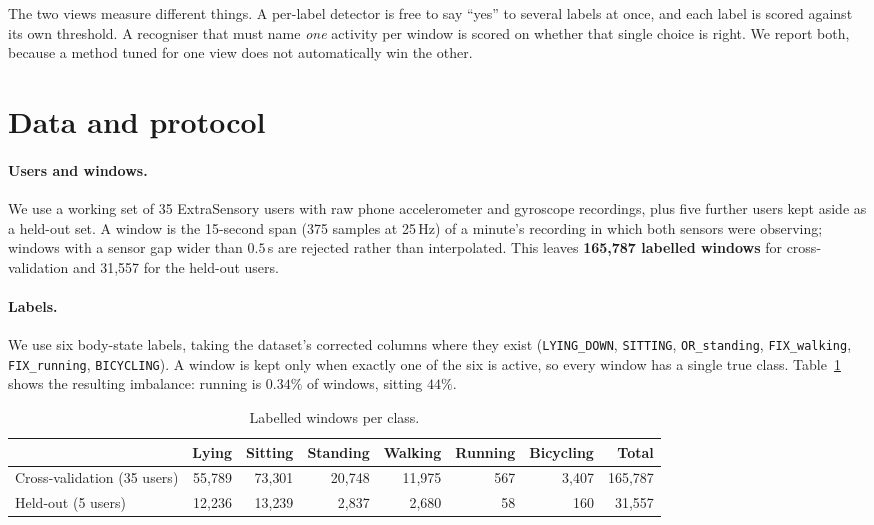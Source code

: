 \documentclass[11pt,a4paper]{article}
\newcommand{\code}[1]{\texttt{\small #1}}
\begin{document}
The two views measure different things. A per-label detector is free to say ``yes'' to
several labels at once, and each label is scored against its own threshold. A
recogniser that must name \emph{one} activity per window is scored on whether that
single choice is right. We report both, because a method tuned for one view does not
automatically win the other.

\section{Data and protocol}
\label{sec:data}

\paragraph{Users and windows.}
We use a working set of 35 ExtraSensory users with raw phone accelerometer and gyroscope
recordings, plus five further users kept aside as a held-out set. A window is
the 15-second span (375 samples at 25\,Hz) of a minute's recording in which both sensors
were observing; windows with a sensor gap wider than $0.5$\,s are rejected rather than
interpolated. This leaves \textbf{165{,}787 labelled windows} for cross-validation and
31{,}557 for the held-out users.

\paragraph{Labels.}
We use six body-state labels, taking the dataset's corrected columns where they exist
(\code{LYING\_DOWN}, \code{SITTING}, \code{OR\_standing}, \code{FIX\_walking},
\code{FIX\_running}, \code{BICYCLING}). A window is kept only when exactly one of the six
is active, so every window has a single true class. Table~\ref{tab:classes} shows the
resulting imbalance: running is $0.34\%$ of windows, sitting $44\%$.

\begin{table}[H]
\centering\small
\caption{Labelled windows per class.}
\label{tab:classes}
\begin{tabular}{@{}lrrrrrr|r@{}}
\toprule
& Lying & Sitting & Standing & Walking & Running & Bicycling & Total \\
\midrule
Cross-validation (35 users) & 55{,}789 & 73{,}301 & 20{,}748 & 11{,}975 & 567 & 3{,}407 & 165{,}787 \\
Held-out (5 users)          & 12{,}236 & 13{,}239 &  2{,}837 &  2{,}680 &  58 &   160 &  31{,}557 \\
\bottomrule
\end{tabular}
\end{table}
\end{document}
